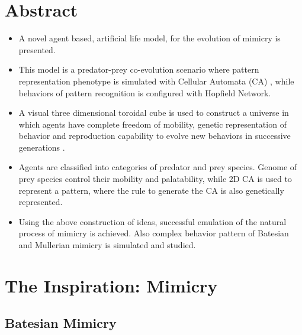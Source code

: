 \documentclass[a0,portrait]{a0poster}
\begin{document}
\begin{multicols}{2}
\color{Navy} %

\section*{Abstract}

\begin{itemize}
	\item A novel agent based, artificial life model, for the evolution of mimicry is presented.
	\item This model is a predator-prey co-evolution scenario where pattern representation phenotype is simulated with Cellular Automata (CA) \citep{Wolfram2002}, while behaviors of pattern recognition is configured with Hopfield Network.
	\item A visual three dimensional toroidal cube is used to construct a universe in which agents have complete freedom of mobility, genetic representation of behavior and reproduction capability to evolve new behaviors in successive generations \citep{grogono2003}.
	\item Agents are classified into categories of predator and prey species. Genome of prey species control their mobility and palatability, while 2D CA is used to represent a pattern, where the rule to generate the CA is also genetically represented.
	\item Using the above construction of ideas, successful emulation of the natural process of mimicry is achieved. Also complex behavior pattern of Batesian and Mullerian mimicry is simulated and studied.
\end{itemize}


\color{SaddleBrown} 


\section*{The Inspiration: Mimicry}
\subsection*{Batesian Mimicry}


\end{multicols}
\end{document}
